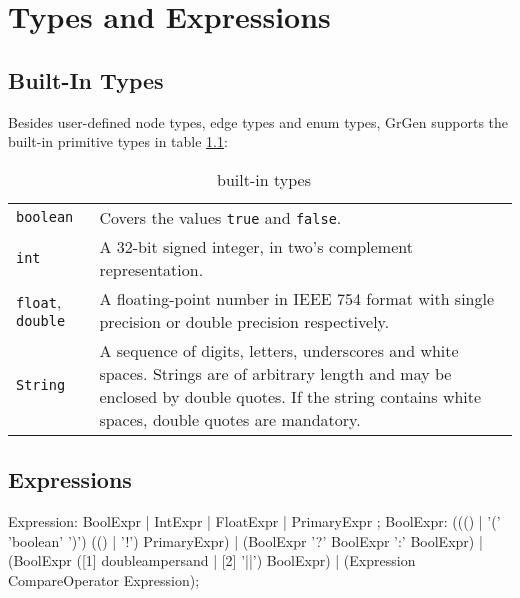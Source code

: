 \chapter{Types and Expressions}
\label{expressions}

\section{Built-In Types}
Besides user-defined node types, edge types and enum types, GrGen supports the built-in primitive types in table \ref{builtintypes}:
\begin{table}[htbp]
\begin{tabularx}{\linewidth}{|l|X|}\hline
	\texttt{boolean} & Covers the values \texttt{true} and \texttt{false}. \\
	\texttt{int} & A 32-bit signed integer, in two's complement representation. \\
	\texttt{float}, \texttt{double} & A floating-point number in IEEE 754 format with single precision or double precision respectively. \\
	\texttt{String} & A sequence of digits, letters, underscores and white spaces. Strings are of arbitrary length and may be enclosed by double quotes. If the string contains white spaces, double quotes are mandatory.\\ \hline
\end{tabularx}
\caption{\GrG\ built-in types}
\label{builtintypes}
\end{table}

\section{Expressions}
\begin{rail}
  Expression: BoolExpr | IntExpr | FloatExpr | PrimaryExpr ;  
  BoolExpr: ((() | '(' 'boolean' ')') (() | '!') PrimaryExpr) | (BoolExpr '?' BoolExpr ':' BoolExpr) | (BoolExpr ([1] doubleampersand | [2] '||') BoolExpr) | (Expression CompareOperator Expression);
\end{rail}


